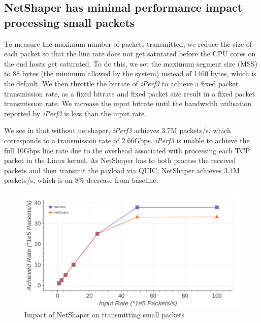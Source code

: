 \subsection{NetShaper has minimal performance impact processing small packets}
\label{subsec:netshaper-evaluation-num-packets}

To measure the maximum number of packets transmitted, we reduce the size of each packet so that the line rate does not get saturated before the CPU cores on the end hosts get saturated.
To do this, we set the maximum segment size (MSS) to 88 bytes (the minimum allowed by the system) instead of 1460 bytes, which is the default.
We then throttle the bitrate of \textit{iPerf3} to achieve a fixed packet transmission rate, as a fixed bitrate and fixed packet size result in a fixed packet transmission rate.
We increase the input bitrate until the bandwidth utilisation reported by \textit{iPerf3} is less than the input rate.

We see in  that without netshaper, \textit{iPerf3} achieves 3.7M packets/s, which corresponds to a transmission rate of 2.66Gbps.
\textit{iPerf3} is unable to achieve the full 10Gbps line rate due to the overhead associated with processing each TCP packet in the Linux kernel.
As NetShaper has to both process the received packets and then transmit the payload via QUIC, NetShaper achieves 3.4M packets/s, which is an 8\% decrease from baseline.

\begin{figure}[!htb]
    \centering
    \includegraphics[width=\columnwidth]{figures/netshaper/evaluation/num_packets.png}
    \caption{Impact of NetShaper on transmitting small packets}
    \label{fig:netshaper-eval-num-packets}
\end{figure}